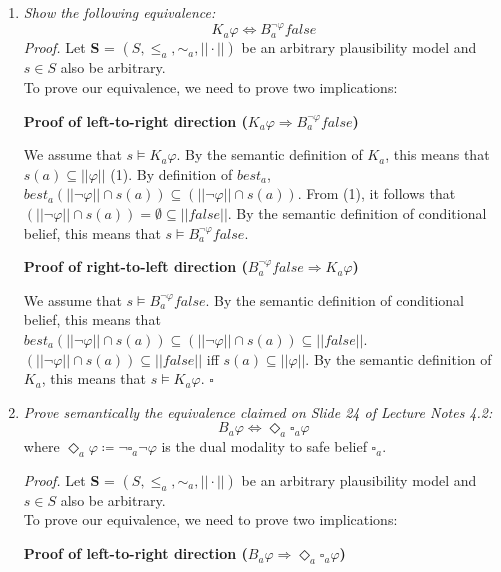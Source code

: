\documentclass[leqno]{article}
\begin{document}
\begin{enumerate}[label=(\alph*)]
	\item \textit{Show the following equivalence:}
		$$K_a \varphi \Leftrightarrow B_a^{\neg \varphi} false$$
		\textit{Proof.} Let \textbf{S} = $(S, \le_a, \sim_a, ||\cdot||)$ be an
		arbitrary plausibility model and $s \in S$ also be arbitrary.\\
		To prove our equivalence, we need to prove two implications:

		\textbf{Proof of left-to-right direction
		($K_a \varphi \Rightarrow B_a^{\neg \varphi} false$)}

		We assume that $s \models K_a \varphi$. By the semantic definition of $K_a$,
		this means that $s(a) \subseteq ||\varphi||$ (1). By definition of $best_a$,
		$best_a(||\neg \varphi|| \cap s(a)) \subseteq
		(||\neg \varphi|| \cap s(a))$. From (1), it follows that
		$(||\neg \varphi|| \cap s(a)) = \emptyset \subseteq ||false||$. By the
		semantic definition of conditional belief, this means that
		$s \models B_a^{\neg \varphi} false$.

		\textbf{Proof of right-to-left direction
		($B_a^{\neg \varphi} false \Rightarrow K_a \varphi$)}

		We assume that $s \models B_a^{\neg \varphi} false$. By the semantic
		definition of conditional belief, this means that
		$best_a(||\neg \varphi|| \cap s(a)) \subseteq (||\neg \varphi|| \cap s(a))
		\subseteq ||false||$. $(||\neg \varphi|| \cap s(a)) \subseteq ||false||$ iff
		$s(a) \subseteq ||\varphi||$. By the semantic definition of $K_a$, this means
		 that $s \models K_a \varphi$.
		\hfill $\square$

	\item \textit{Prove semantically the equivalence claimed on Slide 24 of
		Lecture Notes 4.2:}
		$$B_a \varphi \Leftrightarrow \Diamond_a \square_a \varphi$$
		where $\Diamond_a \varphi \coloneqq \neg \square_a \neg \varphi$ is the dual
		modality to safe belief $\square_a$.

		\textit{Proof.} Let \textbf{S} = $(S, \le_a, \sim_a, ||\cdot||)$ be an
		arbitrary plausibility model and $s \in S$ also be arbitrary.\\
		To prove our equivalence, we need to prove two implications:

		\textbf{Proof of left-to-right direction
		($B_a \varphi \Rightarrow \Diamond_a \square_a \varphi$)}


\end{enumerate}
\end{document}
